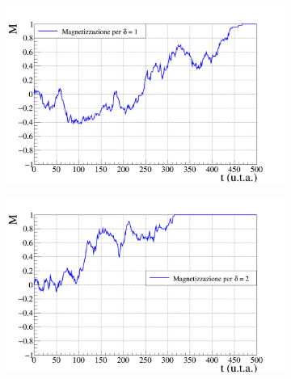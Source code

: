 \documentclass[letterpaper,10pt]{article}
\begin{document}
\begin{figure}[h]
\centering
\begin{subfigure}{0.8\textwidth}
\includegraphics[width=\linewidth]{magn_graph_d1.png}
\end{subfigure}
\begin{subfigure}{0.8\textwidth}
\includegraphics[width=\linewidth]{magn_graph_d2.png}
\end{subfigure}
\end{figure}
\end{document}
